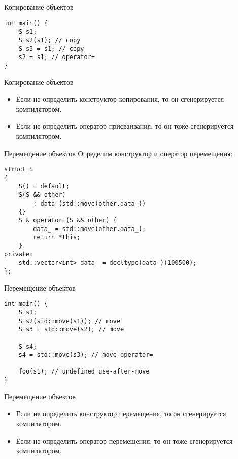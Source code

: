 \documentclass{beamer}
\begin{document}
\begin{frame}[fragile]{Копирование объектов}{}
    \begin{lstlisting}    
int main() {
    S s1;
    S s2(s1); // copy
    S s3 = s1; // copy
    s2 = s1; // operator=
}
    \end{lstlisting}
\end{frame}
    
\begin{frame}[fragile]{Копирование объектов}{}
    \begin{itemize}
        \item Если не определить конструктор копирования,
            то он сгенерируется компилятором.
        \item Если не определить оператор присваивания,
            то он тоже сгенерируется компилятором.
    \end{itemize}
\end{frame}

\begin{frame}[fragile]{Перемещение объектов}{}
    Определим конструктор и оператор перемещения:
    \begin{lstlisting}
struct S 
{
    S() = default;
    S(S && other)
        : data_(std::move(other.data_))
    {}
    S & operator=(S && other) {
        data_ = std::move(other.data_);
        return *this;
    }
private:
    std::vector<int> data_ = decltype(data_)(100500);
};
    \end{lstlisting}
\end{frame}

\begin{frame}[fragile]{Перемещение объектов}{}
    \begin{lstlisting}    
int main() {
    S s1;
    S s2(std::move(s1)); // move
    S s3 = std::move(s2); // move

    S s4;
    s4 = std::move(s3); // move operator=
    
    foo(s1); // undefined use-after-move
}
    \end{lstlisting}
\end{frame}
    
\begin{frame}[fragile]{Перемещение объектов}{}
    \begin{itemize}
        \item Если не определить конструктор перемещения,
            то он сгенерируется компилятором.
        \item Если не определить оператор перемещения,
            то он тоже сгенерируется компилятором.
    \end{itemize}
\end{frame}
\end{document}
